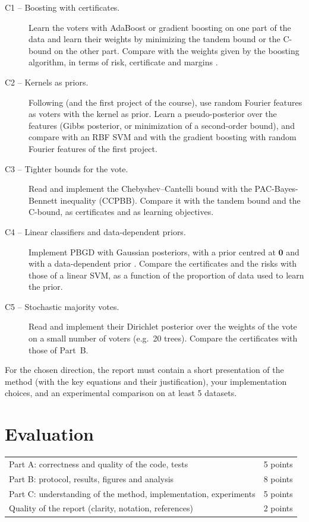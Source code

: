 \documentclass[11pt]{article}
\begin{document}
\begin{description}
\item[C1 -- Boosting with certificates.] Learn the voters with AdaBoost or gradient boosting on one part of the
      data and learn their weights by minimizing the tandem bound or the C-bound on the other part. Compare with the
      weights given by the boosting algorithm, in terms of risk, certificate and margins \citep{schapire1998boosting,roy2016column}.
\item[C2 -- Kernels as priors.] Following \citet{letarte2019pseudo} (and the first project of the course), use random
      Fourier features as voters with the kernel as prior. Learn a pseudo-posterior over the features (Gibbs posterior,
      or minimization of a second-order bound), and compare with an RBF SVM and with the gradient boosting with random
      Fourier features of the first project.
\item[C3 -- Tighter bounds for the vote.] Read \citet{wu2021chebyshev} and implement the Chebyshev--Cantelli
      bound with the PAC-Bayes-Bennett inequality (CCPBB). Compare it with the tandem bound and the C-bound, as
      certificates and as learning objectives.
\item[C4 -- Linear classifiers and data-dependent priors.] Implement PBGD \citep{germain2009pac} with Gaussian
      posteriors, with a prior centred at $\mathbf 0$ and with a data-dependent prior
      \citep{ambroladze2006tighter,parrado2012pac}. Compare the certificates and the risks with those of a linear SVM,
      as a function of the proportion of data used to learn the prior.
\item[C5 -- Stochastic majority votes.] Read \citet{zantedeschi2021learning} and implement their Dirichlet posterior
      over the weights of the vote on a small number of voters (e.g.\ 20 trees). Compare the certificates with those of Part~B.
\end{description}
For the chosen direction, the report must contain a short presentation of the method (with the key equations
and their justification), your implementation choices, and an experimental comparison on at least 5 datasets.

\section{Evaluation}

\begin{center}
\begin{tabular}{lr}
\toprule
Part A: correctness and quality of the code, tests & 5 points \\
Part B: protocol, results, figures and analysis & 8 points \\
Part C: understanding of the method, implementation, experiments & 5 points \\
Quality of the report (clarity, notation, references) & 2 points \\
\bottomrule
\end{tabular}
\end{center}
\end{document}

